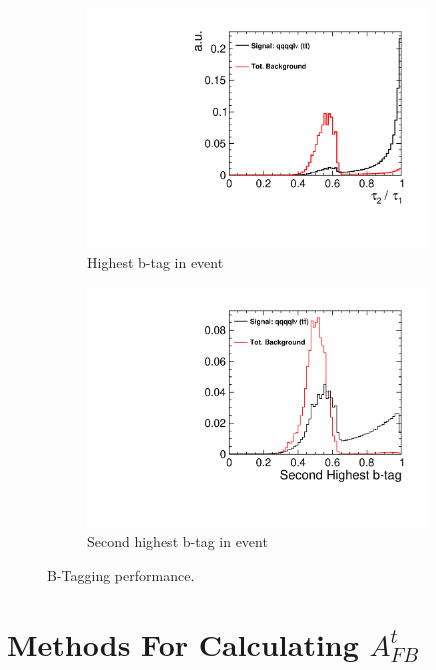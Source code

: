 \begin{figure}
  \centering
  \begin{subfigure}{.5\textwidth}
    \centering
    \includegraphics[width=0.99\textwidth]{TopAnalysis/figures/HighestBTag.pdf}
    \caption[Highest b-tag in event]{Highest b-tag in event}
  \end{subfigure}%
  \begin{subfigure}{.5\textwidth}
    \centering
    \includegraphics[width=0.99\textwidth]{TopAnalysis/figures/NextHighestBTag.pdf}
    \caption[Second highest b-tag event in event]{Second highest b-tag in event}
  \end{subfigure}
  \caption[B-Tagging performance]{B-Tagging performance.}
  \label{fig:btagging}
\end{figure}


\section{Methods For Calculating $A_{FB}^t$}
\label{Calculating AFB}

